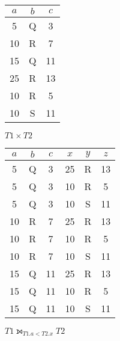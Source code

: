 \begin{problem}
\begin{enumalph}
    \begin{Answer}
      \centering
      \begin{tabular}{|c|c|c|}
        \hline
        $a$ & $b$ & $c$ \\
        \hline
        5 & Q & 3 \\
        \hline
        10 & R & 7 \\
        \hline
        15 & Q & 11 \\
        \hline
        25 & R & 13 \\
        \hline
        10 & R & 5 \\
        \hline
        10 & S & 11 \\
        \hline
      \end{tabular}
    \end{Answer}
    \item $T1 \times T2$
    
    \begin{Answer}
      \centering
      \begin{tabular}{|c|c|c|c|c|c|}
        \hline
        $a$ & $b$ & $c$ & $x$ & $y$ & $z$ \\
        \hline
        5 & Q & 3 & 25 & R & 13 \\
        \hline
        5 & Q & 3 & 10 & R & 5 \\
        \hline
        5 & Q & 3 & 10 & S & 11 \\
        \hline
        10 & R & 7 & 25 & R & 13 \\
        \hline
        10 & R & 7 & 10 & R & 5 \\
        \hline
        10 & R & 7 & 10 & S & 11 \\
        \hline
        15 & Q & 11 & 25 & R & 13 \\
        \hline
        15 & Q & 11 & 10 & R & 5 \\
        \hline
        15 & Q & 11 & 10 & S & 11 \\
        \hline
      \end{tabular}
    \end{Answer}

    \newpage
    \item $T1 \leftouterjoin_{T1.a < T2.x} T2$
    
    \begin{Answer}
      

\end{Answer}
\end{enumalph}
\end{problem}
